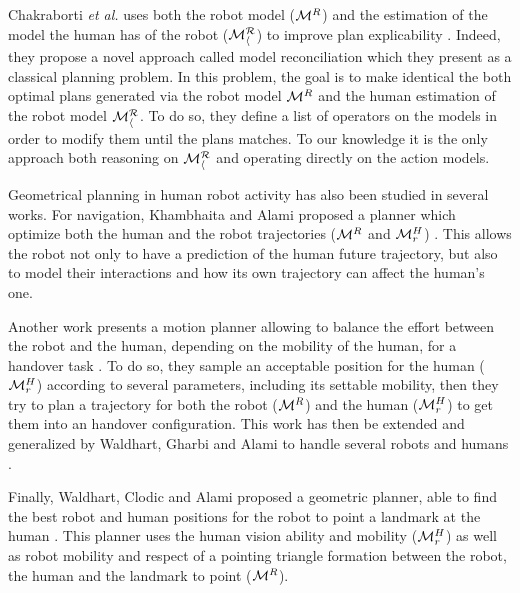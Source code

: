 \documentclass[a4paper,11pt,twoside]{StyleThese}
\begin{document}

Chakraborti \textit{et al.} uses both the robot model ($\mathcal{M}^R$) and the estimation of the model the human has of the robot ($\mathcal{M^R_h}$) to improve plan explicability \cite{chakraborti2017plan}. Indeed, they propose a novel approach called model reconciliation which they present as a classical planning problem. In this problem, the goal is to make identical the both optimal plans generated via the robot model $\mathcal{M}^R$ and the human estimation of the robot model $\mathcal{M^R_h}$. To do so, they define a list of operators on the models in order to modify them until the plans matches. To our knowledge it is the only approach both reasoning on $\mathcal{M^R_h}$ and operating directly on the action models.

Geometrical planning in human robot activity has also been studied in several works. For navigation, Khambhaita and Alami proposed a planner which optimize both the human and the robot trajectories ($\mathcal{M}^R$ and $\mathcal{M}^H_r$) \cite{khambhaita_viewing_2017}. This allows the robot not only to have a prediction of the human future trajectory, but also to model their interactions and how its own trajectory can affect the human's one.

Another work presents a motion planner allowing to balance the effort between the robot and the human, depending on the mobility of the human, for a handover task \cite{mainprice2012sharing}. To do so, they sample an acceptable position for the human ($\mathcal{M}^H_r$) according to several parameters, including its settable mobility, then they try to plan a trajectory for both the robot ($\mathcal{M}^R$) and the human ($\mathcal{M}^H_r$) to get them into an handover configuration. This work has then be extended and generalized by Waldhart, Gharbi and Alami to handle several robots and humans \cite{waldhart2015planning}.

Finally, Waldhart, Clodic and Alami proposed a geometric planner, able to find the best robot and human positions for the robot to point a landmark at the human \cite{waldhart_reasoning_shared_2019}. This planner uses the human vision ability and mobility ($\mathcal{M}^H_r$) as well as robot mobility and respect of a pointing triangle formation between the robot, the human and the landmark to point ($\mathcal{M}^R$).


\ifdefined{}
\else


\end{document}
